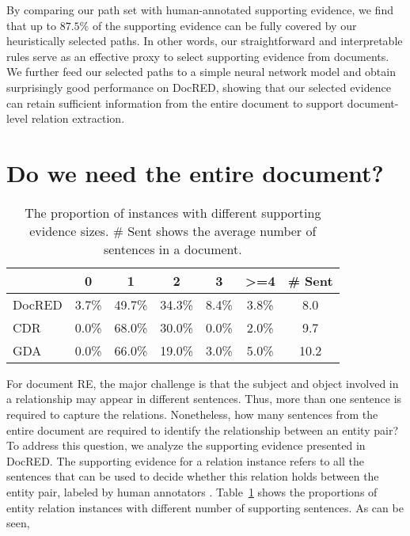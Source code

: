 \documentclass[11pt,a4paper]{article}
\begin{document}
By comparing our path set with human-annotated supporting evidence, we find that up to $87.5\%$ of the supporting evidence can be fully covered by our heuristically selected paths. In other words, our straightforward and interpretable rules serve as an effective proxy to select supporting evidence from documents. We further feed our selected paths to a simple neural network model and obtain surprisingly good performance on DocRED, showing that our selected evidence can retain sufficient information from the entire document to support document-level relation extraction. 

\section{Do we need the entire document?}
\label{sec:do_we}

\begin{table}[]
\centering
\setlength{\tabcolsep}{4pt}
\small
\begin{tabular}{lccccc|c}
\toprule
          & 0     & 1                          & 2      & 3     & \textgreater{}=4 & \# Sent \\ \midrule
DocRED     & 3.7\% & \multicolumn{1}{c}{49.7\%} & 34.3\% & 8.4\% & 3.8\%            & 8.0       \\ \midrule
CDR  & 0.0\% & \multicolumn{1}{c}{68.0\%} & 30.0\% & 0.0\% & 2.0\%            & 9.7       \\
GDA  & 0.0\% & 66.0\%                     & 19.0\% & 3.0\% & 5.0\%            & 10.2      \\ \bottomrule
\end{tabular}

\caption{The proportion of instances with different supporting evidence sizes. \# Sent shows the average number of sentences in a document.}
\label{tab:size_of_supporting_evidence}
\vspace{-0.25cm}
\end{table}
 
For document RE, the major challenge is that the subject and object involved in a relationship may appear in different sentences. Thus, more than one sentence is required to capture the relations. 
Nonetheless, how many sentences from the entire document are required to identify the relationship between an entity pair? To address this question, we analyze the supporting evidence presented in DocRED. 
The supporting evidence for a relation instance refers to all the sentences that can be used to decide whether this relation holds between the entity pair,  labeled by human annotators \cite{yao_docred_2019}. 
Table~\ref{tab:size_of_supporting_evidence} shows the proportions of entity relation instances with different number of supporting sentences. As can be seen, 
\end{document}
